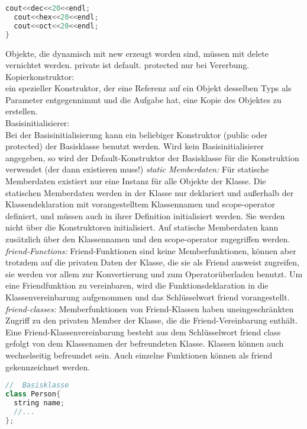 \begin{multicols*}{3}
\begin{lstlisting}[language=C++]
  cout<<dec<<20<<endl;
  cout<<hex<<20<<endl;
  cout<<oct<<20<<endl;
}
\end{lstlisting}
Objekte, die dynamisch mit new erzeugt worden sind, müssen mit delete vernichtet werden.
private ist default. protected nur bei Vererbung.
Kopierkonstruktor:\\
ein spezieller Konstruktor, der eine Referenz auf ein Objekt desselben Typs als Parameter entgegennimmt und die Aufgabe hat, eine Kopie des Objektes zu erstellen. \\
Basisinitialisierer:\\
Bei der Basisinitialisierung kann ein beliebiger Konstruktor (public oder protected) der Basisklasse benutzt werden.
Wird kein Basisinitialisierer angegeben, so wird der Default-Konstruktor der Basisklasse für die Konstruktion verwendet (der dann existieren muss!)
\emph{static Memberdaten:} Für statische Memberdaten existiert nur eine Instanz für alle Objekte der Klasse. Die statischen Memberdaten werden in der Klasse nur deklariert und außerhalb der Klassendeklaration mit vorangestelltem Klassennamen und scope-operator definiert, und müssen auch in ihrer Definition initialisiert werden. Sie werden nicht über die Konstruktoren initialisiert. Auf statische Memberdaten kann zusätzlich über den Klassennamen und den scope-operator zugegriffen werden.\\
\emph{friend-Functions:} Friend-Funktionen sind keine Memberfunktionen, können aber trotzdem auf die privaten Daten der Klasse, die sie als Friend ausweist zugreifen, sie werden vor allem zur Konvertierung und zum Operatorüberladen benutzt. Um eine Friendfunktion zu vereinbaren, wird die Funktionsdeklaration in die Klassenvereinbarung aufgenommen und das Schlüsselwort friend vorangestellt.\\
\emph{friend-classes:} Memberfunktionen von Friend-Klassen haben uneingeschränkten Zugriff zu den privaten Member der Klasse, die die Friend-Vereinbarung enthält. Eine Friend-Klassenvereinbarung besteht aus dem Schlüsselwort friend class gefolgt von dem Klassenamen der befreundeten Klasse. Klassen können auch wechselseitig befreundet sein. Auch einzelne Funktionen können als friend gekennzeichnet werden.
\begin{lstlisting}[language=C++]
//	Basisklasse
class Person{
  string name;
  //...
};


\end{lstlisting}
\end{multicols*}
